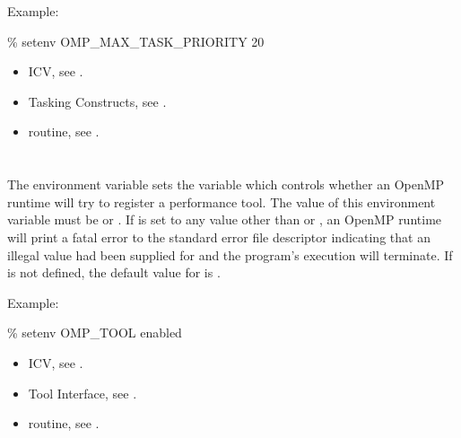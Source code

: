 Example:
\begin{boxedcode}
\% setenv OMP\_MAX\_TASK\_PRIORITY 20
\end{boxedcode}

\crossreferences
\begin{itemize}
\item {} ICV, see .
\item Tasking Constructs, see .
\item {} routine, see .
\end{itemize}


\section{}
\label{sec:OMP_TOOL}

The  environment variable sets the  variable which controls whether an OpenMP runtime will try to register a performance tool.
The value of this environment variable must be  or .
If  is set to any value other than  or , an OpenMP runtime will print a fatal error to the standard error file descriptor indicating that an illegal value had been supplied for  and the program's execution will terminate.
If  is not defined, the default value for  is .

Example:
\begin{boxedcode}
\% setenv OMP\_TOOL enabled
\end{boxedcode}

\crossreferences
\begin{itemize}
\item {} ICV, see .
\item Tool Interface, see .
\item {} routine, see .
\end{itemize}




\section{}
\label{sec:OMP_TOOL_LIBRARIES}

